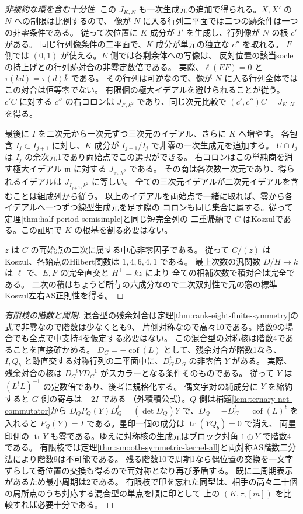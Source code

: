 \begin{proof}[非被約な環を含む十分性]
この $J_{K,N}$ も一次生成元の追加で得られる。$X,X'$ の $N$ への制限は比例するので、
像が $N$ に入る行列二平面では二つの跡条件は一つの非零条件である。
従って次位置に $K$ 成分が $I'$ を生成し、行列像が $N$ の根 $c'$ がある。
同じ行列像条件の二平面で、$K$ 成分が単元の独立な $c''$ を取れる。
$F$ 側では $(0,1)$ が使える。$E$ 側では各剰余体への写像は、
反対位置の該当socleの持上げとの行列跡対合の非零定数倍である。
実際、$\ell(EF)=0$ と $\tau(kd)=\tau(d)\bar k$ である。
その行列は可逆なので、像が $N$ に入る行列全体ではこの対合は恒等零でない。
有限個の極大イデアルを避けられることが従う。
$c'C$ に対する $c''$ の右コロンは $J_{I',k^2}$ であり、同じ次元比較で
$(c',c'')C=J_{K,N}$ を得る。

最後に $I$ を二次元から一次元ずつ三次元のイデアル、さらに $K$ へ増やす。
各包含 $I_j\subset I_{j+1}$ に対し、$K$ 成分が $I_{j+1}/I_j$ で非零の一次生成元を追加する。
$U\cap I_j$ は $I_j$ の余次元1であり両始点でこの選択ができる。
右コロンはこの単純商を消す極大イデアル $\mathfrak m$ に対する $J_{\mathfrak m,k^2}$ である。
その商は各次数一次元であり、得られるイデアルは $J_{I_{j+1},k^2}$ に等しい。
全ての三次元イデアルが二次元イデアルを含むことは組成列から従う。
以上のイデアルを両始点で一緒に取れば、零から各イデアルへ一つずつ線型生成元を足す際の
コロンも同じ集合に属する。従って定理\ref{thm:half-period-semisimple}と同じ短完全列の
二重帰納で $C$ はKoszulである。この証明で $K$ の根基を割る必要はない。

$z$ は $C$ の両始点の二次に属する中心非零因子である。
従って $C/(z)$ はKoszul、各始点のHilbert関数は $1,4,6,4,1$ である。
最上次数の汎関数 $D/H\to k$ は $\ell$ で、$E,F$ の完全直交と $H^\perp=kz$ により
全ての相補次数で積対合は完全である。
二次の積はちょうど所与の六成分なので二次双対性で元の窓の標準Koszul左右AS正則性を得る。
\end{proof}

\begin{proof}[有限枝の階数と周期]
混合型の残余対合は定理\ref{thm:rank-eight-finite-symmetry}の式で非零なので階数は少なくとも9、
片側対称なので高々10である。階数9の場合でも全点で中支持4を仮定する必要はない。
この混合型の対称核は階数4であることを直接確かめる。
$D_G=-\operatorname{cof}(L)$ として、残余対合が階数1なら、
$I,Q_b$ と跡直交する対称行列の二平面中に、$D_G^tD_G$ の非零倍 $Y$ がある。
実際、残余対合の核は $D_G^{-t}Y D_G^{-1}$ がスカラーとなる条件そのものである。
従って $Y$ は $(L^tL)^{-1}$ の定数倍であり、後者に規格化する。
偶文字対の純成分に $Y$ を縮約すると $G$ 側の寄与は $-2I$ である
（外積積公式）。$Q$ 側は補題\ref{lem:ternary-net-commutator}から
$D_Q P_Q(Y)D_Q^t=(\det D_Q)Y$ で、$D_Q=-D_G^t=\operatorname{cof}(L)^t$ を入れると
$P_Q(Y)=I$ である。星印一個の成分は $\operatorname{tr}(YQ_b)=0$ で消え、
両星印側の $\operatorname{tr}Y$ も零である。ゆえに対称核の生成元はブロック対角 $1\oplus Y$ で階数4である。
有限枝では定理\ref{thm:smooth-symmetric-kernel-all}と両対称AS階数二分法により階数9は不可能である。
残る階数10で周期1なら偶位置の交換を一文字ずらして奇位置の交換も得るので両対称となり再び矛盾する。
既に二周期表示があるため最小周期は2である。
有限枝で印を忘れた同型は、相手の高々二十個の局所点のうち対応する混合型の単点を順に印として
上の $(K,\tau,[m])$ を比較すれば必要十分である。
\end{proof}

